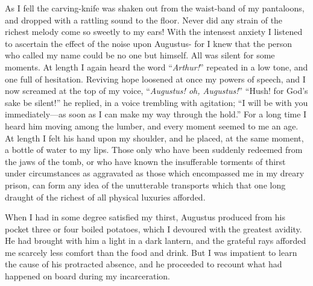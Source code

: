 As I fell the carving-knife was shaken out from the waist-band of my
pantaloons, and dropped with a rattling sound to the floor. Never did any strain
of the richest melody come so sweetly to my ears! With the intensest anxiety I
listened to ascertain the effect of the noise upon Augustus- for I knew that the
person who called my name could be no one but himself. All was silent for some
moments. At length I again heard the word ``\emph{Arthur!}'' repeated in a low
tone, and one full of hesitation. Reviving hope loosened at once my powers of
speech, and I now screamed at the top of my voice, ``\emph{Augustus! oh,
Augustus!}'' ``Hush! for God's sake be silent!'' he replied, in a voice
trembling with agitation; ``I will be with you immediately---as soon as I can
make my way through the hold.'' For a long time I heard him moving among the
lumber, and every moment seemed to me an age. At length I felt his hand upon my
shoulder, and he placed, at the same moment, a bottle of water to my lips. Those
only who have been suddenly redeemed from the jaws of the tomb, or who have
known the insufferable torments of thirst under circumstances as aggravated as
those which encompassed me in my dreary prison, can form any idea of the
unutterable transports which that one long draught of the richest of all
physical luxuries afforded. 

When I had in some degree satisfied my thirst, Augustus produced from his
pocket three or four boiled potatoes, which I devoured with the greatest
avidity. He had brought with him a light in a dark lantern, and the grateful
rays afforded me scarcely less comfort than the food and drink. But I was
impatient to learn the cause of his protracted absence, and he proceeded to
recount what had happened on board during my incarceration. 


